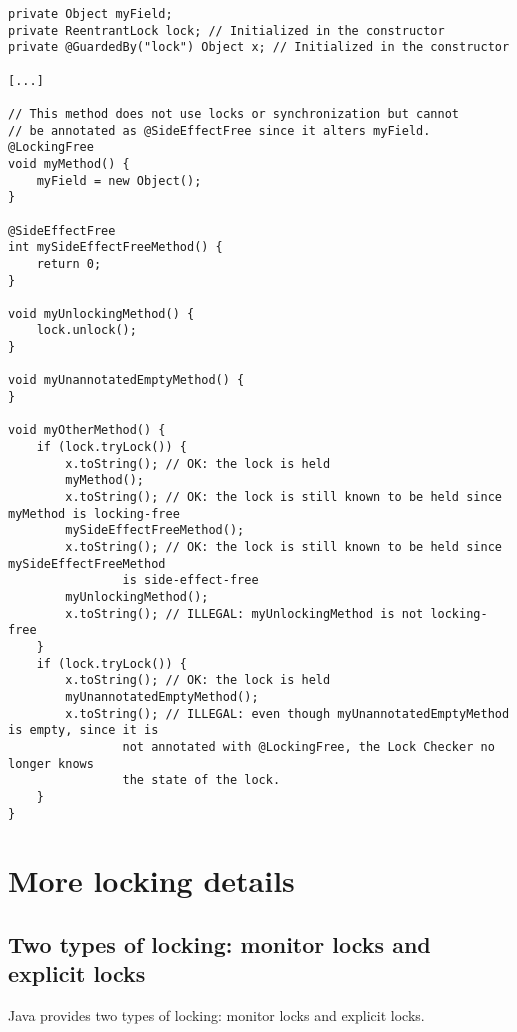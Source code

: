 \begin{verbatim}
private Object myField;
private ReentrantLock lock; // Initialized in the constructor
private @GuardedBy("lock") Object x; // Initialized in the constructor

[...]

// This method does not use locks or synchronization but cannot
// be annotated as @SideEffectFree since it alters myField.
@LockingFree
void myMethod() {
    myField = new Object();
}

@SideEffectFree
int mySideEffectFreeMethod() {
    return 0;
}

void myUnlockingMethod() {
    lock.unlock();
}

void myUnannotatedEmptyMethod() {
}

void myOtherMethod() {
    if (lock.tryLock()) {
        x.toString(); // OK: the lock is held
        myMethod();
        x.toString(); // OK: the lock is still known to be held since myMethod is locking-free
        mySideEffectFreeMethod();
        x.toString(); // OK: the lock is still known to be held since mySideEffectFreeMethod
                is side-effect-free
        myUnlockingMethod();
        x.toString(); // ILLEGAL: myUnlockingMethod is not locking-free
    }
    if (lock.tryLock()) {
        x.toString(); // OK: the lock is held
        myUnannotatedEmptyMethod();
        x.toString(); // ILLEGAL: even though myUnannotatedEmptyMethod is empty, since it is
                not annotated with @LockingFree, the Lock Checker no longer knows
                the state of the lock.
    }
}
\end{verbatim}




\section{More locking details\label{lock-details}}

\subsection{Two types of locking:  monitor locks and explicit locks\label{lock-two-types}}

Java provides two types of locking:  monitor locks and explicit locks.

